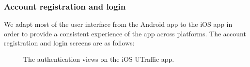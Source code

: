 \subsubsection{Account registration and login}
We adapt most of the user interface from the Android app to the iOS app in order to provide a consistent experience of the app across platforms. The account registration and login screens are as follows:
\begin{figure}[H]
    \centering
    \hspace{2cm}
    \label{fig:ios_auth_views}
    \caption{The authentication views on the iOS UTraffic app.}
\end{figure}


